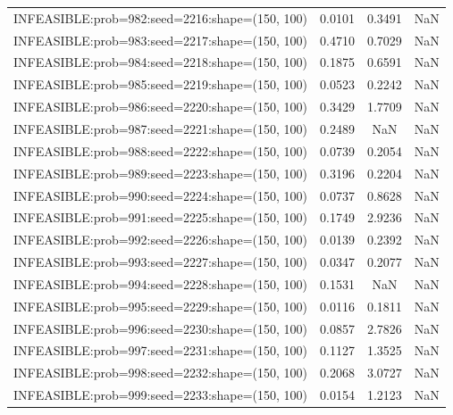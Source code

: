 \begin{longtable}{lccc}
INFEASIBLE:prob=982:seed=2216:shape=(150, 100) & 0.0101 &  0.3491 &    NaN \\
INFEASIBLE:prob=983:seed=2217:shape=(150, 100) & 0.4710 &  0.7029 &    NaN \\
INFEASIBLE:prob=984:seed=2218:shape=(150, 100) & 0.1875 &  0.6591 &    NaN \\
INFEASIBLE:prob=985:seed=2219:shape=(150, 100) & 0.0523 &  0.2242 &    NaN \\
INFEASIBLE:prob=986:seed=2220:shape=(150, 100) & 0.3429 &  1.7709 &    NaN \\
INFEASIBLE:prob=987:seed=2221:shape=(150, 100) & 0.2489 &     NaN &    NaN \\
INFEASIBLE:prob=988:seed=2222:shape=(150, 100) & 0.0739 &  0.2054 &    NaN \\
INFEASIBLE:prob=989:seed=2223:shape=(150, 100) & 0.3196 &  0.2204 &    NaN \\
INFEASIBLE:prob=990:seed=2224:shape=(150, 100) & 0.0737 &  0.8628 &    NaN \\
INFEASIBLE:prob=991:seed=2225:shape=(150, 100) & 0.1749 &  2.9236 &    NaN \\
INFEASIBLE:prob=992:seed=2226:shape=(150, 100) & 0.0139 &  0.2392 &    NaN \\
INFEASIBLE:prob=993:seed=2227:shape=(150, 100) & 0.0347 &  0.2077 &    NaN \\
INFEASIBLE:prob=994:seed=2228:shape=(150, 100) & 0.1531 &     NaN &    NaN \\
INFEASIBLE:prob=995:seed=2229:shape=(150, 100) & 0.0116 &  0.1811 &    NaN \\
INFEASIBLE:prob=996:seed=2230:shape=(150, 100) & 0.0857 &  2.7826 &    NaN \\
INFEASIBLE:prob=997:seed=2231:shape=(150, 100) & 0.1127 &  1.3525 &    NaN \\
INFEASIBLE:prob=998:seed=2232:shape=(150, 100) & 0.2068 &  3.0727 &    NaN \\
INFEASIBLE:prob=999:seed=2233:shape=(150, 100) & 0.0154 &  1.2123 &    NaN \\
\end{longtable}

